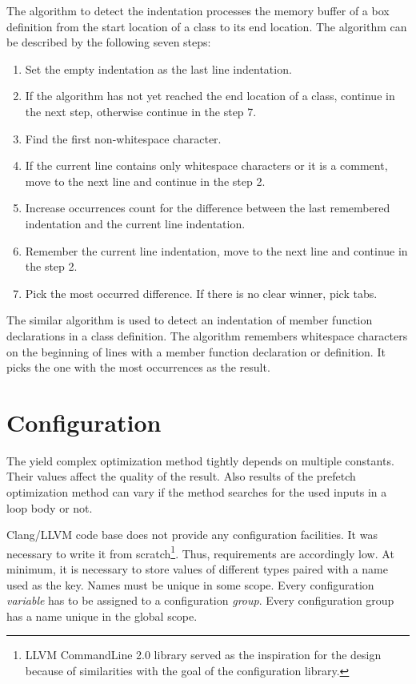 The algorithm to detect the indentation processes the memory buffer of a box definition from the start location of a class to its end location. The algorithm can be described by the following seven steps:

\begin{enumerate}
\item{Set the empty indentation as the last line indentation.}
\item{If the algorithm has not yet reached the end location of a class, continue in the next step, otherwise continue in the step 7.}
\item{Find the first non-whitespace character.}
\item{If the current line contains only whitespace characters or it is a comment, move to the next line and continue in the step 2.}
\item{Increase occurrences count for the difference between the last remembered indentation and the current line indentation.}
\item{Remember the current line indentation, move to the next line and continue in the step 2.}
\item{Pick the most occurred difference. If there is no clear winner, pick tabs.}
\end{enumerate}

The similar algorithm is used to detect an indentation of member function declarations in a class definition. The algorithm remembers whitespace characters on the beginning of lines with a member function declaration or definition. It picks the one with the most occurrences as the result.

\section{Configuration}
\label{opt-configuration}
The yield complex optimization method tightly depends on multiple constants. Their values affect the quality of the result. Also results of the prefetch optimization method can vary if the method searches for the used inputs in a loop body or not.

Clang/LLVM code base does not provide any configuration facilities. It was necessary to write it from scratch\footnote{LLVM CommandLine 2.0 library served as the inspiration for the design because of similarities with the goal of the configuration library.}. Thus, requirements are accordingly low. At minimum, it is necessary to store values of different types paired with a name used as the key. Names must be unique in some scope. Every configuration \emph{variable} has to be assigned to a configuration \emph{group}. Every configuration group has a name unique in the global scope.

